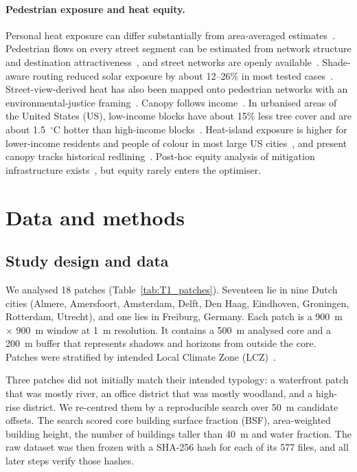\documentclass[preprint,12pt,authoryear]{elsarticle}
\newcommand{\degC}{\ensuremath{^\circ}C}
\begin{document}
\paragraph{Pedestrian exposure and heat equity.}
Personal heat exposure can differ substantially from area-averaged estimates~\citep{kuras2017}. Pedestrian flows on every street segment can be estimated from network structure and destination attractiveness~\citep{sevtsuk2021}, and street networks are openly available~\citep{boeing2017,osm2026}. Shade-aware routing reduced solar exposure by about 12--26\% in most tested cases~\citep{kolaxidis2025}. Street-view-derived heat has also been mapped onto pedestrian networks with an environmental-justice framing~\citep{vu2025}. Canopy follows income~\citep{schwarz2015}. In urbanised areas of the United States (US), low-income blocks have about 15\% less tree cover and are about 1.5~\degC{} hotter than high-income blocks~\citep{mcdonald2021}. Heat-island exposure is higher for lower-income residents and people of colour in most large US cities~\citep{hsu2021,chakraborty2019,benz2021}, and present canopy tracks historical redlining~\citep{locke2021}. Post-hoc equity analysis of mitigation infrastructure exists~\citep{sanchez2019}, but equity rarely enters the optimiser.

\section{Data and methods}\label{sec:methods}

\subsection{Study design and data}\label{sec:data}

We analysed 18 patches (Table~\ref{tab:T1_patches}). Seventeen lie in nine Dutch cities (Almere, Amersfoort, Amsterdam, Delft, Den Haag, Eindhoven, Groningen, Rotterdam, Utrecht), and one lies in Freiburg, Germany. Each patch is a 900~m $\times$ 900~m window at 1~m resolution. It contains a 500~m analysed core and a 200~m buffer that represents shadows and horizons from outside the core. Patches were stratified by intended Local Climate Zone (LCZ)~\citep{stewart2012,demuzere2022}.

Three patches did not initially match their intended typology: a waterfront patch that was mostly river, an office district that was mostly woodland, and a high-rise district. We re-centred them by a reproducible search over 50~m candidate offsets. The search scored core building surface fraction (BSF), area-weighted building height, the number of buildings taller than 40~m and water fraction. The raw dataset was then frozen with a SHA-256 hash for each of its 577 files, and all later steps verify those hashes.
\end{document}
